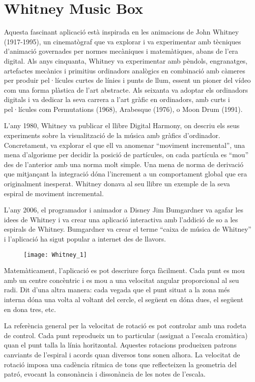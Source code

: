 \section{Whitney Music Box}
Aquesta fascinant aplicació està inspirada en les animacions de John Whitney (1917-1995), un cinematògraf que va explorar i va experimentar amb tècniques d'animació governades per normes mecàniques i matemàtiques, abans de l'era digital. Als anys cinquanta, Whitney va experimentar amb pèndols, engranatges, artefactes mecànics i primitius ordinadors analògics en combinació amb càmeres per produir pel·lícules curtes de línies i punts de llum, essent un pioner del vídeo com una forma plàstica de l'art abstracte. Als seixanta va adoptar els ordinadors digitals i va dedicar la seva carrera a l'art gràfic en ordinadors, amb curts i pel·lícules com Permutations (1968),   Arabesque (1976), o Moon Drum (1991).

L'any 1980, Whitney va publicar el llibre Digital Harmony, on descriu els seus experiments sobre la visualització de la música amb gràfics d'ordinador. Concretament, va explorar el que ell va anomenar ``moviment incremental'', una mena d'algorisme per decidir la posició de partícules, on cada partícula es ``mou'' des de l'anterior amb una norma molt simple. Una mena de norma de derivació que mitjançant la integració dóna l'increment a un comportament global que era originalment inesperat. Whitney donava al seu llibre un exemple de la seva espiral de moviment incremental. 

L'any 2006, el programador i animador a Disney Jim Bumgardner va agafar les idees de Whitney i va crear una aplicació interactiva amb l'addició de so a les espirals de Whitney. Bumgardner va crear el terme ``caixa de música de Whitney'' i l'aplicació ha sigut popular a internet des de llavors. 



\begin{figure}[h]
\centering
\texttt{[image: Whitney\_1]}
\end{figure}

Matemàticament, l'aplicació es pot descriure força fàcilment. Cada punt es mou amb un centre concèntric i es mou a una velocitat angular proporcional al seu radi. Dit d'una altra manera: cada vegada que el punt situat a la zona més interna dóna una volta al voltant del cercle, el següent en dóna dues, el següent en dona tres, etc.

La referència general per la velocitat de rotació es pot controlar amb una rodeta de control. Cada punt reprodueix un to particular (assignat a l'escala cromàtica) quan el punt talla la línia horitzontal. Aquestes rotacions produeixen patrons canviants de l'espiral i acords quan diversos tons sonen alhora. La velocitat de rotació imposa una cadència rítmica de tons que reflecteixen la geometria del patró, evocant la consonància i dissonància de les notes de l'escala. 

